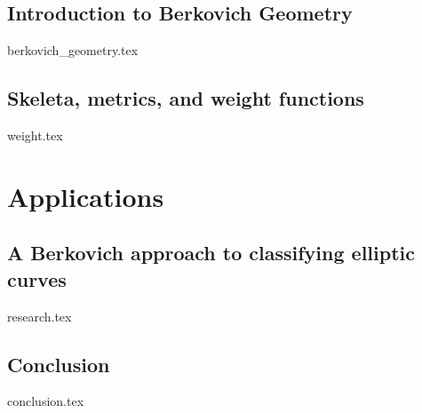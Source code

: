 \chapter{Introduction to Berkovich Geometry} \label{chap:intro_berkovich}
{berkovich_geometry.tex}


\chapter{Skeleta, metrics, and weight functions} \label{chap:weight_functions}
{weight.tex}

\part{Applications}
\chapter{A Berkovich approach to classifying elliptic curves} \label{chap:a_berkovich_approach_to_classifying_elliptic_curves}
{research.tex}

\chapter{Conclusion} \label{chap:conclusion}
{conclusion.tex}

\pagebreak
\printbibliography


